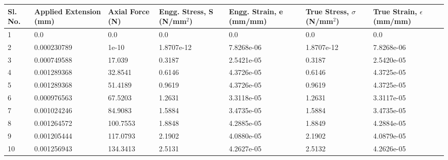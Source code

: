 \documentclass[12pt]{report}
\begin{document}
\begin{tabular}{|p{0.5cm}|p{2.1cm}|p{1.5cm}|p{2cm}|p{2cm}|p{2cm}|p{2cm}|}
    \hline
    Sl. No. & Applied Extension (mm) & Axial Force (N) & Engg. Stress, S (N/mm\(^2\)) & Engg. Strain, e (mm/mm) & True Stress, \(\sigma\) (N/mm\(^2\)) & True Strain, \(\epsilon\) (mm/mm) \\
    \hline
    1       & 0.0                    & 0.0             & 0.0                          & 0.0                     & 0.0                                  & 0.0                               \\
    2       & 0.000230789            & 1e-10           & 1.8707e-12                   & 7.8268e-06              & 1.8707e-12                           & 7.8268e-06                        \\
    3       & 0.000749588            & 17.039          & 0.3187                       & 2.5421e-05              & 0.3187                               & 2.5420e-05                        \\
    4       & 0.001289368            & 32.8541         & 0.6146                       & 4.3726e-05              & 0.6146                               & 4.3725e-05                        \\
    5       & 0.001289368            & 51.4189         & 0.9619                       & 4.3726e-05              & 0.9619                               & 4.3725e-05                        \\
    6       & 0.000976563            & 67.5203         & 1.2631                       & 3.3118e-05              & 1.2631                               & 3.3117e-05                        \\
    7       & 0.001024246            & 84.9083         & 1.5884                       & 3.4735e-05              & 1.5884                               & 3.4735e-05                        \\
    8       & 0.001264572            & 100.7553        & 1.8848                       & 4.2885e-05              & 1.8849                               & 4.2884e-05                        \\
    9       & 0.001205444            & 117.0793        & 2.1902                       & 4.0880e-05              & 2.1902                               & 4.0879e-05                        \\
    10      & 0.001256943            & 134.3413        & 2.5131                       & 4.2627e-05              & 2.5132                               & 4.2626e-05                        \\

\end{tabular}
\end{document}
